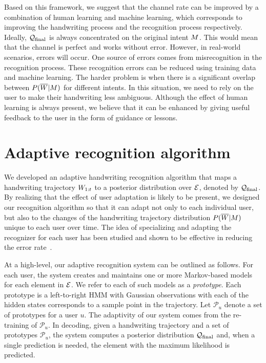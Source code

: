 \documentclass{sigchi}
\begin{document}
Based on this framework, we suggest that the channel rate can be improved
by a combination of human learning and machine learning, which
corresponds to improving the handwriting process and the recognition
process respectively. Ideally, $\mathcal{Q}_{\mathrm{final}}$ is always concentrated
on the original intent $M$. This would mean that the channel is
perfect and works without error. However, in real-world scenarios,
errors will occur. One source of errors comes from misrecognition in
the recognition process. These recognition errors can be reduced using
training data and machine learning. The harder problem is when there
is a significant overlap between $P(\overline{W} | M)$ for different
intents. In this situation, we need to rely on the user to make
their handwriting less ambiguous. Although the effect of human
learning is always present, we believe that it can be enhanced by
giving useful feedback to the user in the form of guidance or lessons.


\section{Adaptive recognition algorithm}
\label{sec:recognition_algorithm}

\newcommand{\prototypeSet}{\mathcal{P}}

We developed an adaptive handwriting recognition algorithm that maps a
handwriting trajectory $W_{1:{t}}$ to a posterior distribution over
$\mathcal{E}$, denoted by $\mathcal{Q}_{\mathrm{final}}$. By realizing that the effect of
user adaptation is likely to be present, we designed our recognition
algorithm so that it can adapt not only to each individual user, but
also to the changes of the handwriting trajectory distribution
$P(\overline{W} | M)$ unique to each user over time. The idea of specializing
and adapting the recognizer for each user has been studied and shown
to be effective in reducing the error rate~\cite{Connell2002, Matic93,
  Kienzle06}.

At a high-level, our adaptive recognition system can be outlined as
follows. For each user, the system creates and maintains one or more
Markov-based models~\cite{ThomasPloetz2011} for each element in
$\mathcal{E}$. We refer to each of such models as a {\em
  prototype}. Each prototype is a left-to-right HMM with Gaussian
observations with each of the hidden states corresponds to a sample
point in the trajectory. Let $\prototypeSet_u$ denote a set of
prototypes for a user $u$. The adaptivity of our system comes from the
re-training of $\prototypeSet_u$. In decoding, given a handwriting
trajectory and a set of prototypes $\prototypeSet_u$, the system
computes a posterior distribution $\mathcal{Q}_{\mathrm{final}}$ and, when a single
prediction is needed, the element with the maximum likelihood is
predicted.
\end{document}
